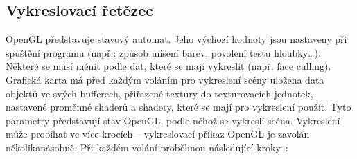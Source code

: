 \documentclass[thesis=M,czech]{FITthesis}[2019/12/23]
\begin{document}
\subsection{Vykreslovací řetězec}
OpenGL představuje stavový automat. Jeho výchozí hodnoty jsou nastaveny při spuštění programu (např.: způsob mísení barev, povolení testu hloubky\dots). Některé se musí měnit podle dat, které se mají vykreslit (např. face culling). Grafická karta má před každým voláním pro vykreslení scény uložena data objektů ve svých bufferech, přiřazené textury do texturovacích jednotek, nastavené proměnné shaderů a shadery, které se mají pro vykreslení použít. Tyto parametry představují stav OpenGL, podle něhož se vykreslí scéna. Vykreslení může probíhat ve více krocích -- vykreslovací příkaz OpenGL je zavolán několikanásobně. Při každém volání proběhnou následující kroky~\cite{kronos_render}:
\end{document}
